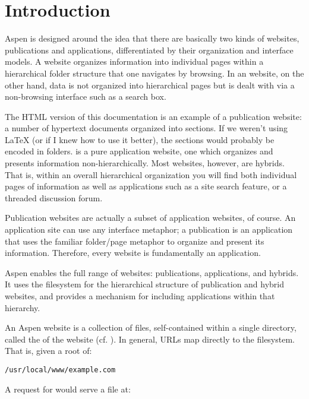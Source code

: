 \chapter{Introduction \label{introduction}}

Aspen is designed around the idea that there are basically two kinds of
websites, publications and applications, differentiated by their organization
and interface models. A  website organizes information into
individual pages within a hierarchical folder structure that one navigates by
browsing. In an  website, on the other hand, data is not
organized into hierarchical pages but is dealt with via a non-browsing interface
such as a search box.

The HTML version of this documentation is an example of a publication website: a
number of hypertext documents organized into sections. If we weren't using LaTeX
(or if I knew how to use it better), the sections would probably be encoded in
folders.  is a pure application
website, one which organizes and presents information non-hierarchically. Most
websites, however, are hybrids. That is, within an overall hierarchical
organization you will find both individual pages of information as well as
applications such as a site search feature, or a threaded discussion forum.

Publication websites are actually a subset of application websites, of course.
An application site can use any interface metaphor; a publication is an
application that uses the familiar folder/page metaphor to organize and present
its information. Therefore, every website is fundamentally an application.

Aspen enables the full range of websites: publications, applications, and
hybrids. It uses the filesystem for the hierarchical structure of publication
and hybrid websites, and provides a mechanism for including applications within
that hierarchy.

An Aspen website is a collection of files, self-contained within a single
directory, called the  of the website (cf. ). In
general, URLs map directly to the filesystem. That is, given a root of:

\begin{verbatim}
/usr/local/www/example.com
\end{verbatim}

A request for  would serve a file at:

